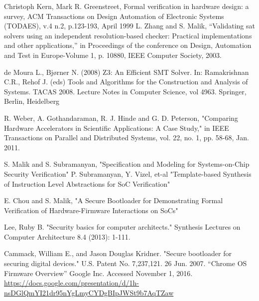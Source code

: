 \documentclass[12pt,lot, lof]{puthesis}
\begin{document}
% 
\begin{flushleft}
\begin{footnotesize}
\begin{thebibliography}{\kern\bibindent}

        Christoph Kern, Mark R. Greenstreet, Formal verification in hardware design: a survey, ACM Transactions on Design Automation of Electronic Systems (TODAES), v.4 n.2, p.123-193, April 1999 
        L. Zhang and S. Malik, “Validating sat solvers using an independent resolution-based checker: Practical implementations and other applications,” in Proceedings of the conference on Design, Automation and Test in Europe-Volume 1, p. 10880, IEEE Computer Society, 2003.

        de Moura L., Bjørner N. (2008) Z3: An Efficient SMT Solver. In: Ramakrishnan C.R., Rehof J. (eds) Tools and Algorithms for the Construction and Analysis of Systems. TACAS 2008. Lecture Notes in Computer Science, vol 4963. Springer, Berlin, Heidelberg

        R. Weber, A. Gothandaraman, R. J. Hinde and G. D. Peterson, "Comparing Hardware Accelerators in Scientific Applications: A Case Study," in IEEE Transactions on Parallel and Distributed Systems, vol. 22, no. 1, pp. 58-68, Jan. 2011.

        S. Malik and S. Subramanyan, "Specification and Modeling for Systems-on-Chip Security Verification"
        P. Subramanyan,  Y. Vizel, et-al "Template-based Synthesis of
        Instruction Level Abstractions for SoC Verification"

E. Chou and S. Malik, "A Secure Bootloader for Demonstrating Formal Verification of Hardware-Firmware Interactions on SoCs"

        Lee, Ruby B. "Security basics for computer architects." Synthesis Lectures on Computer Architecture 8.4 (2013): 1-111.

        Cammack, William E., and Jason Douglas Kridner. "Secure bootloader for securing digital devices." U.S. Patent No. 7,237,121. 26 Jun. 2007.
        ``Chrome OS Firmware Overview'' Google Inc. Accessed November 1, 2016. \url{https://docs.google.com/presentation/d/1h-nsDGlQmYI21dr95nYgLmyCYDgBIpJWSt9b7AqTZaw}        


\end{thebibliography}
\end{footnotesize}
\end{flushleft}
\end{document}
